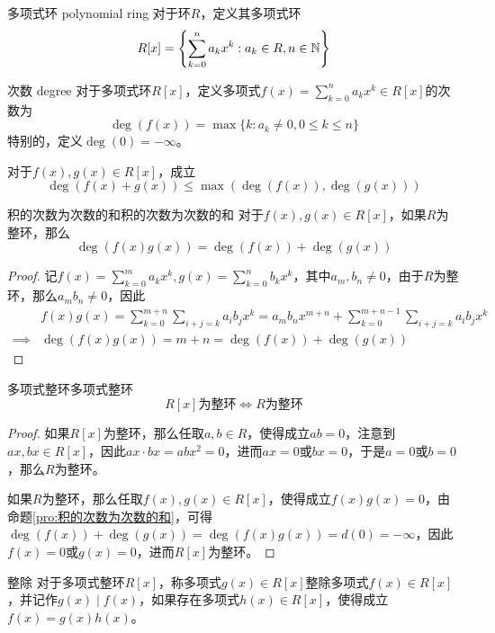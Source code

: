 \begin{definition}{多项式环 polynomial ring}
	对于环$R$，定义其多项式环
	$$
	R[x]=\left\{ \sum_{k=0}^{n}a_kx^k:a_k\in R,n\in\mathbb{N} \right\}
	$$
\end{definition}

\begin{definition}{次数 degree}
	对于多项式环$R[x]$，定义多项式$\displaystyle f(x)=\sum_{k=0}^{n}a_kx^k\in R[x]$的次数为
	$$
	\deg(f(x))=\max\{ k:a_k\ne 0,0\le k \le n \}
	$$
	特别的，定义$\deg(0)=-\infty$。
\end{definition}

\begin{proposition}
	对于$f(x),g(x)\in R[x]$，成立
	$$
	\deg(f(x)+g(x))\le \max(\deg(f(x)),\deg(g(x)))
	$$
\end{proposition}

\begin{proposition}{积的次数为次数的和}{积的次数为次数的和}
	对于$f(x),g(x)\in R[x]$，如果$R$为整环，那么
	$$
	\deg(f(x)g(x))=\deg(f(x))+\deg(g(x))
	$$
\end{proposition}

\begin{proof}
	记$\displaystyle f(x)=\sum_{k=0}^{m}a_k x^k,g(x)=\sum_{k=0}^{n}b_k x^k$，其中$a_m,b_n\ne0$，由于$R$为整环，那么$a_mb_n\ne 0$，因此
	\begin{align*}
		&f(x)g(x)=\sum_{k=0}^{m+n}\sum_{i+j=k}a_i b_j x^{k}=a_mb_nx^{m+n}+\sum_{k=0}^{m+n-1}\sum_{i+j=k}a_i b_j x^{k}\\
		\implies &\deg(f(x)g(x))=m+n=\deg(f(x))+\deg(g(x))
	\end{align*}
\end{proof}

\begin{proposition}{多项式整环}{多项式整环}
	$$
	R[x]\text{为整环}\iff R\text{为整环}
	$$
\end{proposition}

\begin{proof}
	如果$R[x]$为整环，那么任取$a,b\in R$，使得成立$ab=0$，注意到$ax,bx\in R[x]$，因此$ax\cdot bx=abx^2=0$，进而$ax=0$或$bx=0$，于是$a=0$或$b=0$，那么$R$为整环。
	
	如果$R$为整环，那么任取$f(x),g(x)\in R[x]$，使得成立$f(x)g(x)=0$，由命题\ref{pro:积的次数为次数的和}，可得$\deg(f(x))+\deg(g(x))=\deg(f(x)g(x))=d(0)=-\infty$，因此$f(x)=0$或$g(x)=0$，进而$R[x]$为整环。
\end{proof}

\begin{definition}{整除}
	对于多项式整环$R[x]$，称多项式$g(x)\in R[x]$整除多项式$f(x)\in R[x]$，并记作$g(x)\mid f(x)$，如果存在多项式$h(x)\in R[x]$，使得成立$f(x)=g(x)h(x)$。
\end{definition}

